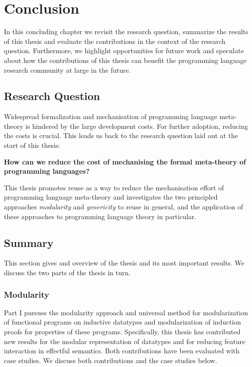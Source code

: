 \chapter{Conclusion}

In this concluding chapter we revisit the research question, summarize the
results of this thesis and evaluate the contributions in the context of the
research question. Furthermore, we highlight opportunities for future work and
speculate about how the contributions of this thesis can benefit the programming
language research community at large in the future.

\section{Research Question}
Widespread formalization and mechanisation of programming language meta-theory
is hindered by the large development costs. For further adoption, reducing the
costs is crucial. This leads us back to the research question laid out at the
start of this thesis:

\begin{center}
  \begin{minipage}{0.8\columnwidth}\bf
    How can we reduce the cost of mechanising the formal meta-theory of
    programming languages?
  \end{minipage}
\end{center}

This thesis promotes reuse as a way to reduce the mechanisation effort of
programming language meta-theory and investigates the two principled approaches
\emph{modularity} and \emph{genericity} to reuse in general, and the application
of these approaches to programming language theory in particular.

\section{Summary}

This section gives and overview of the thesis and its most important results. We
discuss the two parts of the thesis in turn.

\subsection{Modularity}
Part I pursues the modularity approach and universal method for modularization
of functional programs on inductive datatypes and modularization of induction
proofs for properties of these programs. Specifically, this thesis has
contributed new results for the modular representation of datatypes and for
reducing feature interaction in effectful semantics. Both contributions have
been evaluated with case studies. We discuss both contributions and the case
studies below.

